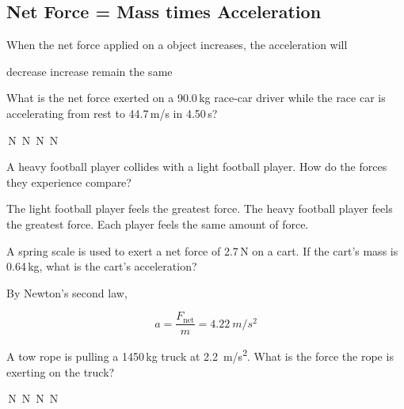\documentclass[../main-physics-problems.tex]{subfiles}
\begin{document}
\begin{questions}
\clearpage
\begin{EnvUplevel}
    \subsection*{Net Force = Mass times Acceleration}
\end{EnvUplevel}

\question
When the net force applied on a object increases, the acceleration will

\begin{randomizechoices}[keeplast]
    \choice decrease
    \correctchoice increase
    \choice remain the same
\end{randomizechoices}

\question
What is the net force exerted on a 90.0\,kg race-car driver while the race car is accelerating from rest to 44.7\,m/s in 4.50\,s?

\begin{randomizechoices}
    \,N
    \,N
    \,N
    \,N
\end{randomizechoices}

\question
A heavy football player collides with a light football player. How do the forces they experience compare?

\begin{randomizechoices}
    \choice The light football player feels the greatest force.
    \choice The heavy football player feels the greatest force.
    \correctchoice Each player feels the same amount of force.
\end{randomizechoices}

\question
A spring scale is used to exert a net force of 2.7\,N on a cart. If the cart's mass is 0.64\,kg, what is the cart's acceleration?

\begin{solution}
By Newton's second law,

\begin{equation*}
    a = \frac{F_\mathrm{net}}{m} = \boxed{\SI{4.22}{m/s^2}}
\end{equation*}
\end{solution}

\question
A tow rope is pulling a 1450\,kg truck at \SI{2.2}{m/s^2}. What is the force the rope is exerting on the truck?

\begin{randomizechoices}
    \,N
    \,N
    \,N
    \,N
\end{randomizechoices}


\end{questions}
\end{document}
